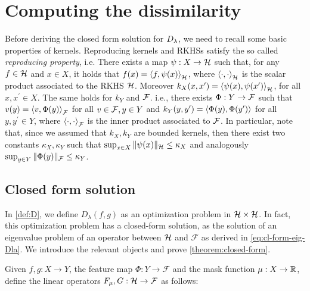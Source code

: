 



\section{Computing the dissimilarity}\label{sec:computing}

Before deriving the closed form solution for $D_\lambda$, we need to recall some basic properties of kernels. Reproducing kernels and RKHSs satisfy the so called {\em reproducing property}, i.e. There exists a map $\psi:X \to \mathcal H$ such that, for any $f \in \mathcal H$ and $x \in X$, it holds that $f(x) = \left\langle{f},{\psi(x)}\right\rangle_\mathcal H$, where $\left\langle{\cdot},{\cdot}\right\rangle_\mathcal H$ is the scalar product associated to the RKHS $\mathcal H$. Moreover $k_X(x,x^\prime) = \left\langle{\psi(x)},{\psi(x^\prime)}\right\rangle_{\mathcal H}$, for all $x,x^\prime \in X$. The same holds for $k_Y$ and $\cal F$. i.e., there exists $\Phi:Y \to {\cal F}$ such that $v(y) = \left\langle{v},{\Phi(y)}\right\rangle_{\cal F}$ for all $v \in {\cal F}, y \in Y$ and $k_Y(y,y^\prime) = \left\langle{\Phi(y)},{\Phi(y^\prime)}\right\rangle$ for all $y,y^\prime \in Y$, where $\left\langle{\cdot},{\cdot}\right\rangle_{\cal F}$ is the inner product associated to ${\cal F}$. In particular, note that, since we assumed that $k_X, k_Y$ are bounded kernels, then there exist two constants $\kappa_X, \kappa_Y$ such that $\sup_{x \in X} \|\psi(x)\|_{\mathcal H} \leq \kappa_X$ and analogously $\sup_{y \in Y} \|\Phi(y)\|_{\cal F} \leq \kappa_Y$.



\subsection{Closed form solution}
In \cref{def:D}, we define $D_\lambda(f,g)$ as an optimization problem in $\mathcal H \times \mathcal H$. In fact, this optimization problem has a closed-form solution, as the solution of an eigenvalue problem of an operator between $\mathcal H$ and $\mathcal F$ as derived in \cref{eq:cl-form-eig-Dla}. We introduce the relevant objects and prove \cref{theorem:closed-form}.

\begin{definition}[Operators $F_\mu$, $G$]\label{def:operatorsFG}
Given $f, g: X \to Y$, the feature map $\Phi: Y\to \mathcal F$ and the mask function $\mu:X \to \mathbb R$, define the linear operators $F_\mu, G:\mathcal H \to {\cal F}$ as follows:
\end{definition}

